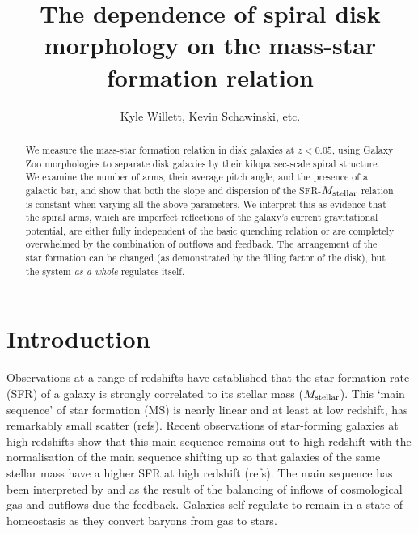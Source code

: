 \documentclass{emulateapj}
\begin{document}
\title{The dependence of spiral disk morphology on the mass-star formation relation}

\author{Kyle Willett, Kevin Schawinski, etc.}



\begin{abstract}
We measure the mass-star formation relation in disk galaxies at $z<0.05$, using Galaxy Zoo morphologies to separate disk galaxies by their kiloparsec-scale spiral structure. We examine the number of arms, their average pitch angle, and the presence of a galactic bar, and show that both the slope and dispersion of the SFR-$M_{\rm stellar}$ relation is constant when varying all the above parameters. We interpret this as evidence that the spiral arms, which are imperfect reflections of the galaxy's current gravitational potential, are either fully independent of the basic quenching relation or are completely overwhelmed by the combination of outflows and feedback. The arrangement of the star formation can be changed (as demonstrated by the filling factor of the disk), but the system \emph{as a whole} regulates itself. 
\end{abstract}



\section{Introduction} \label{sec-intro}


Observations at a range of redshifts have established that the star formation rate (SFR) of a galaxy is strongly correlated to its stellar mass ($M_{\rm stellar}$). This `main sequence' of star formation (MS) is nearly linear and at least at low redshift, has remarkably small scatter (refs). Recent observations of star-forming galaxies at high redshifts show that this main sequence remains out to high redshift with the normalisation of the main sequence shifting up so that galaxies of the same stellar mass have a higher SFR at high redshift (refs). The main sequence has been interpreted by \citet{bou10} and \citet{lil13} as the result of the balancing of inflows of cosmological gas and outflows due the feedback. Galaxies self-regulate to remain in a state of homeostasis as they convert baryons from gas to stars. 
\end{document}
